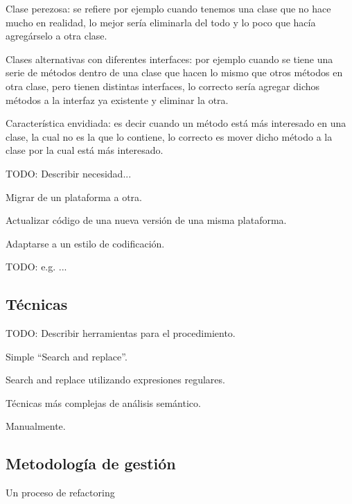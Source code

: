 \documentclass{article}
\begin{document}
\begin{compactitem}
\item Clase perezosa: se refiere por ejemplo cuando tenemos una clase que no hace mucho en realidad, lo mejor sería eliminarla del todo y lo poco que hacía agregárselo a otra clase.
\item Clases alternativas con diferentes interfaces: por ejemplo cuando se tiene una serie de métodos dentro de una clase que hacen lo mismo que otros métodos en otra clase, pero tienen distintas interfaces, lo correcto sería agregar dichos métodos a la interfaz ya existente y eliminar la otra.
\item Característica envidiada: es decir cuando un método está más interesado en una clase, la cual no es la que lo contiene, lo correcto es mover dicho método a la clase por la cual está más interesado.
\end{compactitem}

TODO: Describir necesidad...

\begin{compactitem}
\item Migrar de un plataforma a otra.
\item Actualizar código de una nueva versión de una misma plataforma.
\item Adaptarse a un estilo de codificación.
\end{compactitem}

TODO: e.g. ...

\hypertarget{tecnicas}{}
\subsection{Técnicas}

TODO: Describir herramientas para el procedimiento.

\begin{compactitem}
\item Simple ``Search and replace''.
\item Search and replace utilizando expresiones regulares.
\item Técnicas más complejas de análisis semántico.
\item Manualmente.
\end{compactitem}

\hypertarget{metodologia_de_gestion}{}
\subsection{Metodología de gestión}

Un proceso de refactoring 
\end{document}
